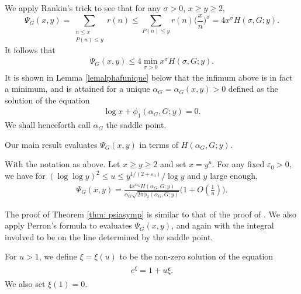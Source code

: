 \documentclass[twoside,leqno,10pt, A4]{amsart}
\begin{document}
  We apply Rankin's trick to see that for any $\sigma > 0$, $x \geq y \geq 2$, 
\begin{equation*}
\Psi_G(x,y) = \sum_{\substack{n \leq x \\ P(n) \leq y}} r(n) \leq \sum_{P(n) \leq y} r(n)\biggl( \frac{x}{n} \biggr)^{\sigma} =  4x^{\sigma} H(\sigma,G; y) .
\end{equation*}
  It follows that 
\begin{align}
\label{Psibound}
  \Psi_G(x,y) \leq 4\min_{\sigma>0}x^{\sigma} H(\sigma,G; y).
\end{align}
  It is shown in Lemma \ref{lemalphafunique} below that the infimum above is in fact a minimum, and is attained for a unique $\alpha_G=\alpha_G(x,y)>0$ defined as
the solution of the equation 
\begin{align}
\label{alphafdef}
  \log x+\phi_1(\alpha_G, G; y)=0.
\end{align}
  We shall henceforth call $\alpha_G$ the saddle point. 
  
Our main result evaluates $\Psi_G(x, y)$ in terms of $H(\alpha_G,G;y)$. 
\begin{theorem}
\label{thm: psiasymp}
 With the notation as above. Let $x \geq y \geq 2$ and set $x=y^u$. For any fixed $\varepsilon_0>0$, we have for $(\log \log y)^2 \leq u \leq y^{1/(2+\varepsilon_0)}/\log y$ and $y$ large enough,
\begin{align}
\label{psiasymp}
\Psi_G(x, y)=\frac {4x^{\alpha_G}H(\alpha_G,G;y)}{\alpha_G\sqrt{2\pi \phi_2(\alpha_G,G;y)}}\Big (1+ O(\frac 1u) \Big ).
\end{align}
\end{theorem} 
   
  The proof of Theorem \ref{thm: psiasymp} is similar to that of the proof of \cite[Theorem 1]{HT86}. We also apply Perron's formula to evaluates $\Psi_G(x, y)$, and again with the integral involved to be on the line determined by the saddle point. 

  For $u>1$, we define $\xi=\xi(u)$ to be the non-zero solution of the equation
\begin{align*}
\begin{split}
 e^{\xi}=1+u\xi.
\end{split}
\end{align*}   
   We also set $\xi(1)=0$. 
\end{document}
